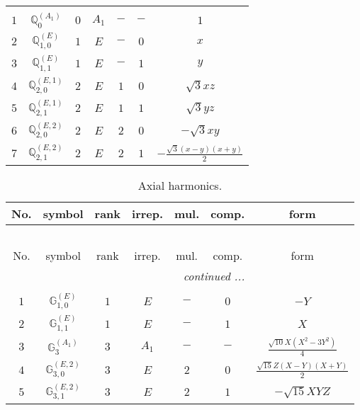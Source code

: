 \documentclass[fleqn,10pt,landscape]{article}
\begin{document}
\begin{itemize}
\begin{center}
\begin{longtable}{ccccccc}
 \hline \hline
\multicolumn{6}{r}{} \\ \endlastfoot

$ 1 $ & $ \mathbb{Q}_{0}^{(A_{1})} $ & $ 0 $ & $ A_{1} $ & $ - $ & $ - $ & $ 1 $ \\ \hline
$ 2 $ & $ \mathbb{Q}_{1,0}^{(E)} $ & $ 1 $ & $ E $ & $ - $ & $ 0 $ & $ x $ \\
$ 3 $ & $ \mathbb{Q}_{1,1}^{(E)} $ & $ 1 $ & $ E $ & $ - $ & $ 1 $ & $ y $ \\ \hline
$ 4 $ & $ \mathbb{Q}_{2,0}^{(E,1)} $ & $ 2 $ & $ E $ & $ 1 $ & $ 0 $ & $ \sqrt{3} x z $ \\
$ 5 $ & $ \mathbb{Q}_{2,1}^{(E,1)} $ & $ 2 $ & $ E $ & $ 1 $ & $ 1 $ & $ \sqrt{3} y z $ \\
$ 6 $ & $ \mathbb{Q}_{2,0}^{(E,2)} $ & $ 2 $ & $ E $ & $ 2 $ & $ 0 $ & $ - \sqrt{3} x y $ \\
$ 7 $ & $ \mathbb{Q}_{2,1}^{(E,2)} $ & $ 2 $ & $ E $ & $ 2 $ & $ 1 $ & $ - \frac{\sqrt{3} \left(x - y\right) \left(x + y\right)}{2} $ \\
\end{longtable}
\end{center}
\begin{center}
\renewcommand{\arraystretch}{1.3}
\begin{longtable}{ccccccc}
\caption{Axial harmonics.}
 \\
 \hline \hline
No. & symbol & rank & irrep. & mul. & comp. & form \\ \hline \endfirsthead

\multicolumn{6}{l}{\tablename\ \thetable{}} \\
 \hline \hline
No. & symbol & rank & irrep. & mul. & comp. & form \\ \hline \endhead

 \hline \hline
\multicolumn{6}{r}{\footnotesize\it continued ...} \\ \endfoot

 \hline \hline
\multicolumn{6}{r}{} \\ \endlastfoot

$ 1 $ & $ \mathbb{G}_{1,0}^{(E)} $ & $ 1 $ & $ E $ & $ - $ & $ 0 $ & $ - Y $ \\
$ 2 $ & $ \mathbb{G}_{1,1}^{(E)} $ & $ 1 $ & $ E $ & $ - $ & $ 1 $ & $ X $ \\ \hline
$ 3 $ & $ \mathbb{G}_{3}^{(A_{1})} $ & $ 3 $ & $ A_{1} $ & $ - $ & $ - $ & $ \frac{\sqrt{10} X \left(X^{2} - 3 Y^{2}\right)}{4} $ \\
$ 4 $ & $ \mathbb{G}_{3,0}^{(E,2)} $ & $ 3 $ & $ E $ & $ 2 $ & $ 0 $ & $ \frac{\sqrt{15} Z \left(X - Y\right) \left(X + Y\right)}{2} $ \\
$ 5 $ & $ \mathbb{G}_{3,1}^{(E,2)} $ & $ 3 $ & $ E $ & $ 2 $ & $ 1 $ & $ - \sqrt{15} X Y Z $ \\
\end{longtable}
\end{center}


\end{itemize}
\end{document}
